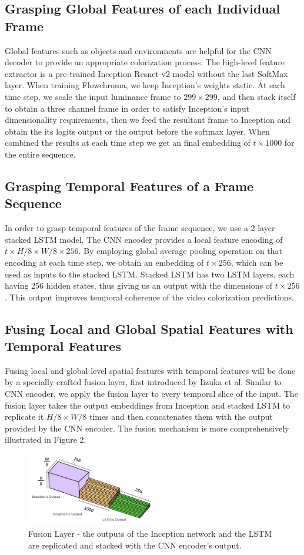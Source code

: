 \documentclass[10pt,twocolumn,letterpaper]{article}
\begin{document}
\subsection{Grasping Global Features of each Individual Frame}
Global features such as objects and environments are helpful for the CNN decoder to provide an appropriate colorization process. The high-level feature extractor is a pre-trained Inception-Resnet-v2 model without the last SoftMax layer. When training Flowchroma, we keep Inception's weights static. At each time step, we scale the input luminance frame to $299\times 299$, and then stack itself to obtain a three channel frame in order to satisfy Inception's input dimensionality requirements, then we feed the resultant frame to Inception and obtain the its logits output or the output before the softmax layer. When combined the results at each time step we get an final embedding of $t\times 1000$ for the entire sequence.


\subsection{Grasping Temporal Features of a Frame Sequence}
In order to grasp temporal features of the frame sequence, we use a 2-layer stacked LSTM model. The CNN encoder provides a local feature encoding of  $t\times H/8\times W/8\times 256$. By employing global average pooling operation on that encoding at each time step, we obtain an embedding of $t\times 256$, which can be used as inputs to the stacked LSTM. Stacked LSTM has two LSTM layers, each having 256 hidden states, thus giving us an output with the dimensions of $t\times 256$. This output improves temporal coherence of the video colorization predictions.

\subsection{Fusing Local and Global Spatial Features with Temporal Features}
Fusing local and global level spatial features with temporal features will be done by a specially crafted fusion layer, first introduced by Iizuka et al. Similar to CNN encoder, we apply the fusion layer to every temporal slice of the input. The fusion layer takes the output embeddings from Inception and stacked LSTM to replicate it $H/8\times W/8$ times and then concatenates them with the output provided by the CNN encoder. The fusion mechanism is more comprehensively illustrated in Figure 2.

\begin{figure}[!h]
  \centering
  \includegraphics[width=0.5\textwidth]{fusion-layer.png}
  \caption{Fusion Layer - the outputs of the Inception network and the LSTM are replicated and stacked with the CNN encoder's output.}
\end{figure}
\end{document}

